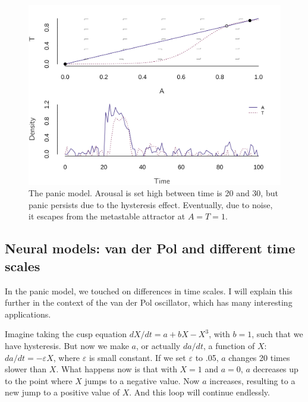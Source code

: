 \documentclass[
  a4paper,
  DIV=11,
  numbers=noendperiod,
  oneside]{scrreprt}
\begin{document}
\begin{figure}

{\centering \includegraphics{media/ch4n/fig-ch4n-img13-old-61.png}

}

\caption{\label{fig-ch4n-img13-old-61}The panic model. Arousal is set
high between time is 20 and 30, but panic persists due to the hysteresis
effect. Eventually, due to noise, it escapes from the metastable
attractor at \(A = T = 1\).}

\end{figure}

\hypertarget{sec-Neural-models-van-der-Pol-and-different-time-scales}{%
\subsection{Neural models: van der Pol and different time
scales}\label{sec-Neural-models-van-der-Pol-and-different-time-scales}}

In the panic model, we touched on differences in time scales. I will
explain this further in the context of the van der Pol oscillator, which
has many interesting applications.

Imagine taking the cusp equation \(dX/dt = {a + bX - X}^{3}\), with
\(b=1\), such that we have hysteresis. But now we make \(a\), or
actually \(da/dt\), a function of \(X\): \(da/dt = - \varepsilon X\),
where \(\varepsilon\) is small constant. If we set \(\varepsilon\) to
.05, \(a\) changes 20 times slower than \(X\). What happens now is that
with \(X = 1\) and \(a = 0\), \(a\) decreases up to the point where
\(X\) jumps to a negative value. Now \(a\) increases, resulting to a new
jump to a positive value of \(X\). And this loop will continue
endlessly.
\end{document}
